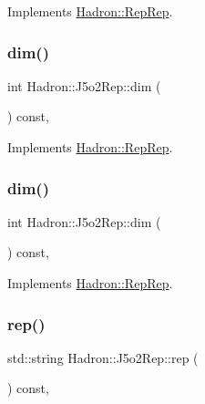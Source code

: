 Implements \mbox{\hyperlink{structHadron_1_1RepRep_a92c8802e5ed7afd7da43ccfd5b7cd92b}{Hadron\+::\+Rep\+Rep}}.

\mbox{\label{structHadron_1_1J5o2Rep_a0a185f6fcbb5ce65c0af1615cf1f4e76}} 
\subsubsection{\texorpdfstring{dim()}{dim()}\hspace{0.1cm}{\footnotesize\ttfamily [2/3]}}
{\footnotesize\ttfamily int Hadron\+::\+J5o2\+Rep\+::dim (\begin{DoxyParamCaption}{ }\end{DoxyParamCaption}) const\hspace{0.3cm}{\ttfamily [inline]}, {\ttfamily [virtual]}}



Implements \mbox{\hyperlink{structHadron_1_1RepRep_a92c8802e5ed7afd7da43ccfd5b7cd92b}{Hadron\+::\+Rep\+Rep}}.

\mbox{\label{structHadron_1_1J5o2Rep_a0a185f6fcbb5ce65c0af1615cf1f4e76}} 
\subsubsection{\texorpdfstring{dim()}{dim()}\hspace{0.1cm}{\footnotesize\ttfamily [3/3]}}
{\footnotesize\ttfamily int Hadron\+::\+J5o2\+Rep\+::dim (\begin{DoxyParamCaption}{ }\end{DoxyParamCaption}) const\hspace{0.3cm}{\ttfamily [inline]}, {\ttfamily [virtual]}}



Implements \mbox{\hyperlink{structHadron_1_1RepRep_a92c8802e5ed7afd7da43ccfd5b7cd92b}{Hadron\+::\+Rep\+Rep}}.

\mbox{\label{structHadron_1_1J5o2Rep_a43d3fc5ff7f61a64d8dac3b700b2c140}} 
\subsubsection{\texorpdfstring{rep()}{rep()}\hspace{0.1cm}{\footnotesize\ttfamily [1/3]}}
{\footnotesize\ttfamily std\+::string Hadron\+::\+J5o2\+Rep\+::rep (\begin{DoxyParamCaption}{ }\end{DoxyParamCaption}) const\hspace{0.3cm}{\ttfamily [inline]}, {\ttfamily [virtual]}}



